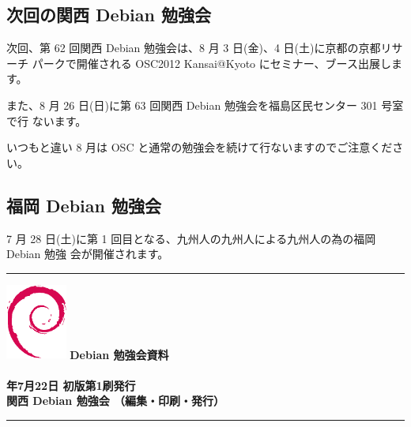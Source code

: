 \documentclass[mingoth,a4paper]{jsarticle}
\newcommand{\debmtgyear}{2012}
\newcommand{\debmtgdate}{22}
\newcommand{\debmtgmonth}{7}
\begin{document}
\clearpage


\subsection{次回の関西 Debian 勉強会}

次回、第 62 回関西 Debian 勉強会は、8 月 3 日(金)、4 日(土)に京都の京都リサーチ
パークで開催される OSC2012 Kansai@Kyoto にセミナー、ブース出展します。

また、8 月 26 日(日)に第 63 回関西 Debian 勉強会を福島区民センター 301 号室で行
ないます。

いつもと違い 8 月は OSC と通常の勉強会を続けて行ないますのでご注意ください。

\subsection{福岡 Debian 勉強会}
7 月 28 日(土)に第 1 回目となる、九州人の九州人による九州人の為の福岡 Debian 勉強
会が開催されます。



\printindex
 \cleartooddpage

 \begin{minipage}[b]{0.2\hsize}
 \end{minipage}
 \begin{minipage}[b]{0.8\hsize}

 \vspace*{15cm}
 \rule{\hsize}{1mm}
 \vspace{2mm}
 \includegraphics[width=2cm]{image200502/openlogo-nd.eps}
 \noindent \Large \bf Debian 勉強会資料\\ \\
 \noindent \normalfont \debmtgyear{}年\debmtgmonth{}月\debmtgdate{}日 \hspace{5mm}  初版第1刷発行\\
 \noindent \normalfont 関西 Debian 勉強会 （編集・印刷・発行）\\
 \rule{\hsize}{1mm}
 \end{minipage}
\end{document}
